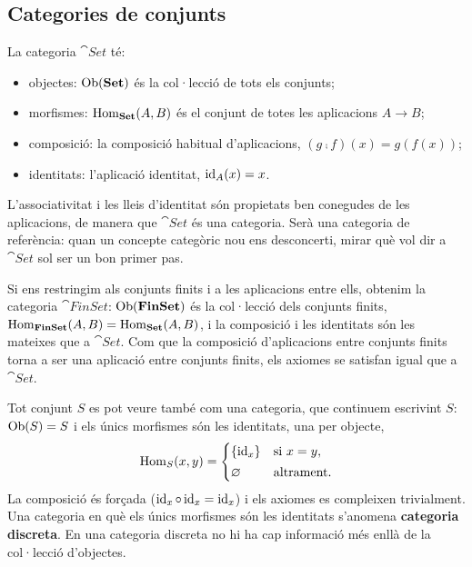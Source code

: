 \subsection{Categories de conjunts}\label{subsec:conjunts}

La categoria $\cat{Set}$ té:
\begin{itemize}
\item objectes: $\operatorname{Ob}(\mathbf{Set})$ és la col·lecció de tots els conjunts;
\item morfismes: $\operatorname{Hom}_{\mathbf{Set}}(A,B)$ és el conjunt de totes les aplicacions $A\to B$;
\item composició: la composició habitual d'aplicacions, $(g\comp f)(x)=g(f(x))$;
\item identitats: l'aplicació identitat, $\operatorname{id}_A(x)=x$.
\end{itemize}
L'associativitat i les lleis d'identitat són propietats ben conegudes de les aplicacions, de manera que $\cat{Set}$ és una categoria. Serà una categoria de referència: quan un concepte categòric nou ens desconcerti, mirar què vol dir a $\cat{Set}$ sol ser un bon primer pas.

Si ens restringim als conjunts finits i a les aplicacions entre ells, obtenim la categoria $\cat{FinSet}$: $\operatorname{Ob}(\mathbf{FinSet})$ és la col·lecció dels conjunts finits, $\operatorname{Hom}_{\mathbf{FinSet}}(A,B)=\operatorname{Hom}_{\mathbf{Set}}(A,B)$, i la composició i les identitats són les mateixes que a $\cat{Set}$. Com que la composició d'aplicacions entre conjunts finits torna a ser una aplicació entre conjunts finits, els axiomes se satisfan igual que a $\cat{Set}$.

Tot conjunt $S$ es pot veure també com una categoria, que continuem escrivint $S$: $\operatorname{Ob}(S)=S$ i els únics morfismes són les identitats, una per objecte,
\[
\operatorname{Hom}_S(x,y)=\begin{cases}\{\operatorname{id}_x\} & \text{si } x=y,\\[2pt] \varnothing & \text{altrament.}\end{cases}
\]
La composició és forçada ($\operatorname{id}_x\circ\operatorname{id}_x=\operatorname{id}_x$) i els axiomes es compleixen trivialment. Una categoria en què els únics morfismes són les identitats s'anomena \textbf{categoria discreta}. En una categoria discreta no hi ha cap informació més enllà de la col·lecció d'objectes.

